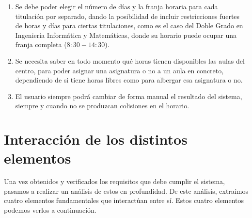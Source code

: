 \begin{enumerate}[REQ-1]
    \item Se debe poder elegir el número de días y la franja horaria para cada titulación por separado, dando la posibilidad de incluir restricciones fuertes de horas y días para ciertas titulaciones, como es el caso del Doble Grado en Ingeniería Informática y Matemáticas, donde su horario puede ocupar una franja completa ($8:30-14:30$).
    \item Se necesita saber en todo momento qué horas tienen disponibles las aulas del centro, para poder asignar una asignatura o no a un aula en concreto, dependiendo de si tiene horas libres como para albergar esa asignatura o no.
    \item El usuario siempre podrá cambiar de forma manual el resultado del sistema, siempre y cuando no se produzcan colisiones en el horario.
\end{enumerate}

\section{Interacción de los distintos elementos}

Una vez obtenidos y verificados los requisitos que debe cumplir el sistema, pasamos a realizar un análisis de estos en profundidad. De este análisis, extraímos cuatro elementos fundamentales que interactúan entre sí. Estos cuatro elementos podemos verlos a continuación.



